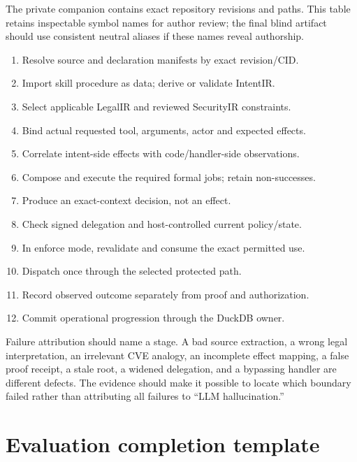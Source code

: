 \documentclass{article}
\begin{document}
The private companion contains exact repository revisions and paths. This table retains inspectable symbol names for author review; the final blind artifact should use consistent neutral aliases if these names reveal authorship.

\begin{enumerate}
\item Resolve source and declaration manifests by exact revision/CID.
\item Import skill procedure as data; derive or validate IntentIR.
\item Select applicable LegalIR and reviewed SecurityIR constraints.
\item Bind actual requested tool, arguments, actor and expected effects.
\item Correlate intent-side effects with code/handler-side observations.
\item Compose and execute the required formal jobs; retain non-successes.
\item Produce an exact-context decision, not an effect.
\item Check signed delegation and host-controlled current policy/state.
\item In enforce mode, revalidate and consume the exact permitted use.
\item Dispatch once through the selected protected path.
\item Record observed outcome separately from proof and authorization.
\item Commit operational progression through the DuckDB owner.
\end{enumerate}

Failure attribution should name a stage. A bad source extraction, a wrong legal interpretation, an irrelevant CVE analogy, an incomplete effect mapping, a false proof receipt, a stale root, a widened delegation, and a bypassing handler are different defects. The evidence should make it possible to locate which boundary failed rather than attributing all failures to ``LLM hallucination.''

\section{Evaluation completion template}

\end{document}
